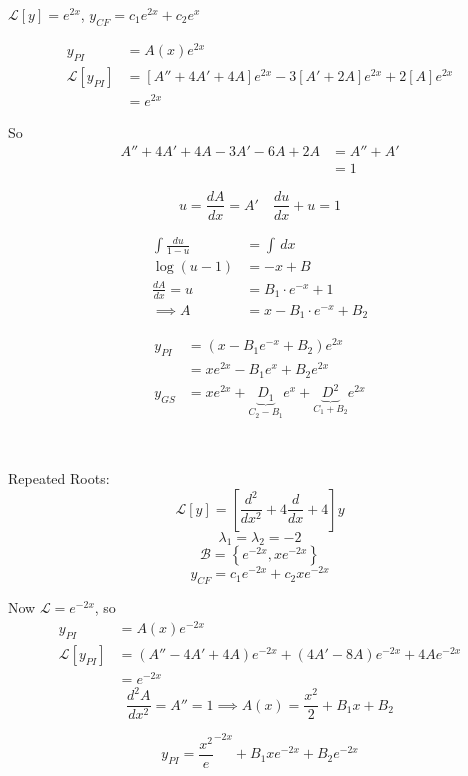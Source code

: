 \documentclass[10pt]{scrartcl}
\begin{document}
\begin{example}
$\mathcal{L}[y] = e^{2x}$, $y_{CF} = c_1e^{2x} +c_2e^{x}$

\[
\begin{aligned}
  y_{PI} &= A(x)e^{2x}\\
  \mathcal{L}[y_{PI}] &= [A'' + 4A' + 4A]e^{2x} -3[A'+2A]e^{2x} + 2[A]e^{2x}\\
  &= e^{2x}
\end{aligned}
\]

So 
\[
\begin{aligned}
  A'' + 4A' + 4A - 3A' - 6A + 2A &= A'' + A'\\
  &= 1
\end{aligned}
\]

\[u = \dfrac{dA}{dx}= A' \quad \frac{du}{dx} + u = 1\]


\[
\begin{aligned}
  \int \frac{du}{1-u} &= \int \,dx\\
  \log(u-1) &= -x + B\\
  \frac{dA}{dx} = u &= B_1\cdot e^{-x} + 1\\
  \implies A &= x -B_1\cdot e^{-x} + B_2
\end{aligned}
\]


\[
\begin{aligned}
  y_{PI} &= (x-B_1e^{-x} + B_2)e^{2x}\\
  &= xe^{2x} -B_1e^{x} + B_2e^{2x}\\
  y_{GS} &= xe^{2x} + \underbrace{D_1}_{C_2-B_1}e^{x} + \underbrace{D^2}_{C_1+B_2}e^{2x}
\end{aligned}
\]
\end{example}~

\begin{example}
Repeated Roots: 
\[\mathcal{L}[y] = \left[\frac{d^2}{dx^2} + 4\frac{d}{dx} + 4\right]y\]	
\[\lambda_1 = \lambda_2 = -2\]
\[\mathcal{B} = \left\{e^{-2x},xe^{-2x}\right\}\]
\[y_{CF} = c_1e^{-2x} + c_2xe^{-2x}\]

Now $\mathcal{L} = e^{-2x}$, so 
\[
\begin{aligned}
  y_{PI} &= A(x)e^{-2x}\\
  \mathcal{L}[y_{PI}] &= (A'' - 4A' + 4A)e^{-2x} + (4A' - 8A)e^{-2x} + 4Ae^{-2x}\\ 
  &= e^{-2x}
\end{aligned}
\]
\[\frac{d^2A}{dx^2} = A'' = 1 \implies A(x) = \frac{x^2}{2} + B_1x + B_2\]

\[y_{PI} = \frac{x^2}e^{-2x} + B_1xe^{-2x} + B_2e^{-2x}\]
\end{example}
\end{document}
